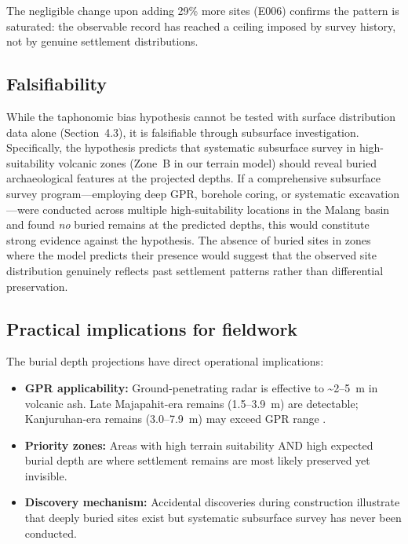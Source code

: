 \documentclass[12pt,a4paper]{article}
\begin{document}
The negligible change upon adding 29\% more sites (E006) confirms the pattern is saturated: the observable record has reached a ceiling imposed by survey history, not by genuine settlement distributions.

\subsection{Falsifiability}

While the taphonomic bias hypothesis cannot be tested with surface distribution data alone (Section~4.3), it is falsifiable through subsurface investigation. Specifically, the hypothesis predicts that systematic subsurface survey in high-suitability volcanic zones (Zone~B in our terrain model) should reveal buried archaeological features at the projected depths. If a comprehensive subsurface survey program---employing deep GPR, borehole coring, or systematic excavation---were conducted across multiple high-suitability locations in the Malang basin and found \textit{no} buried remains at the predicted depths, this would constitute strong evidence against the hypothesis. The absence of buried sites in zones where the model predicts their presence would suggest that the observed site distribution genuinely reflects past settlement patterns rather than differential preservation.

\subsection{Practical implications for fieldwork}

The burial depth projections have direct operational implications:

\begin{itemize}
  \item \textbf{GPR applicability:} Ground-penetrating radar is effective to \textasciitilde2--5~m in volcanic ash. Late Majapahit-era remains (1.5--3.9~m) are detectable; Kanjuruhan-era remains (3.0--7.9~m) may exceed GPR range \citep{conyers2004}.
  \item \textbf{Priority zones:} Areas with high terrain suitability AND high expected burial depth are where settlement remains are most likely preserved yet invisible.
  \item \textbf{Discovery mechanism:} Accidental discoveries during construction illustrate that deeply buried sites exist but systematic subsurface survey has never been conducted.
\end{itemize}
\end{document}
